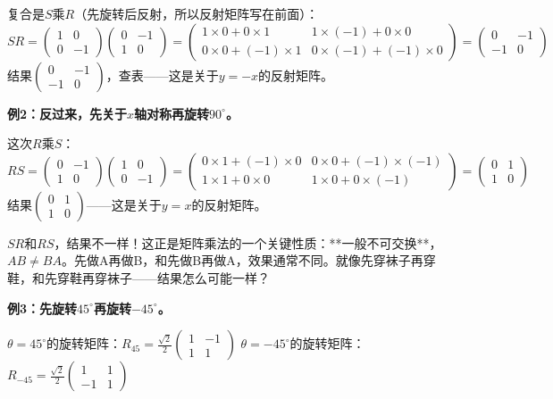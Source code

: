 \documentclass[a4paper,12pt]{ctexart}
\begin{document}
复合是$S$乘$R$（先旋转后反射，所以反射矩阵写在前面）：
\[
SR = \begin{pmatrix}1&0\\0&-1\end{pmatrix}
\begin{pmatrix}0&-1\\1&0\end{pmatrix}
= \begin{pmatrix}
1\times0+0\times1 & 1\times(-1)+0\times0\\
0\times0+(-1)\times1 & 0\times(-1)+(-1)\times0
\end{pmatrix}
= \begin{pmatrix}0&-1\\-1&0\end{pmatrix}
\]
结果$\begin{pmatrix}0&-1\\-1&0\end{pmatrix}$，查表——这是关于$y=-x$的反射矩阵。

\textbf{例2：反过来，先关于$x$轴对称再旋转$90^\circ$。}

这次$R$乘$S$：
\[
RS = \begin{pmatrix}0&-1\\1&0\end{pmatrix}
\begin{pmatrix}1&0\\0&-1\end{pmatrix}
= \begin{pmatrix}
0\times1+(-1)\times0 & 0\times0+(-1)\times(-1)\\
1\times1+0\times0 & 1\times0+0\times(-1)
\end{pmatrix}
= \begin{pmatrix}0&1\\1&0\end{pmatrix}
\]
结果$\begin{pmatrix}0&1\\1&0\end{pmatrix}$——这是关于$y=x$的反射矩阵。

$SR$和$RS$，结果不一样！这正是矩阵乘法的一个关键性质：**一般不可交换**，$AB\neq BA$。先做A再做B，和先做B再做A，效果通常不同。就像先穿袜子再穿鞋，和先穿鞋再穿袜子——结果怎么可能一样？

\textbf{例3：先旋转$45^\circ$再旋转$-45^\circ$。}

$\theta=45^\circ$的旋转矩阵：$R_{45}=\frac{\sqrt2}{2}\begin{pmatrix}1&-1\\1&1\end{pmatrix}$
$\theta=-45^\circ$的旋转矩阵：$R_{-45}=\frac{\sqrt2}{2}\begin{pmatrix}1&1\\-1&1\end{pmatrix}$
\end{document}
